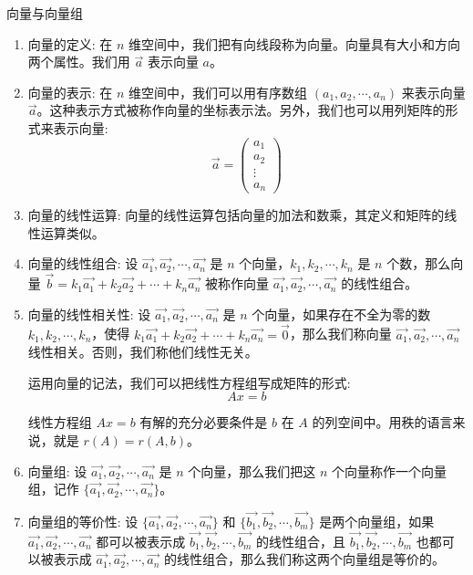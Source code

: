 \documentclass[a4paper,12pt]{ctexart}
\begin{document}
\begin{mydef}{向量与向量组}{}
\begin{enumerate}
    \item 向量的定义: 在 $n$ 维空间中，我们把有向线段称为向量。向量具有大小和方向两个属性。我们用 $\vec{a}$ 表示向量 $a$。
    
    \item 向量的表示: 在 $n$ 维空间中，我们可以用有序数组 $(a_1, a_2, \cdots , a_n)$ 来表示向量 $\vec{a}$。这种表示方式被称作向量的坐标表示法。另外，我们也可以用列矩阵的形式来表示向量:
    \[
    \vec{a} =
    \begin{pmatrix}
    a_1 \\
    a_2 \\
    \vdots \\
    a_n
    \end{pmatrix}
    \]
    
    \item 向量的线性运算: 向量的线性运算包括向量的加法和数乘，其定义和矩阵的线性运算类似。
    
    \item 向量的线性组合: 设 $\vec{a_1}, \vec{a_2}, \cdots , \vec{a_n}$ 是 $n$ 个向量，$k_1, k_2, \cdots , k_n$ 是 $n$ 个数，那么向量 $\vec{b} = k_1 \vec{a_1} + k_2 \vec{a_2} + \cdots + k_n \vec{a_n}$ 被称作向量 $\vec{a_1}, \vec{a_2}, \cdots , \vec{a_n}$ 的线性组合。
    
    \item 向量的线性相关性: 设 $\vec{a_1}, \vec{a_2}, \cdots , \vec{a_n}$ 是 $n$ 个向量，如果存在不全为零的数 $k_1, k_2, \cdots , k_n$，使得 $k_1 \vec{a_1} + k_2 \vec{a_2} + \cdots + k_n \vec{a_n} = \vec{0}$，那么我们称向量 $\vec{a_1}, \vec{a_2}, \cdots , \vec{a_n}$ 线性相关。否则，我们称他们线性无关。
    
    运用向量的记法，我们可以把线性方程组写成矩阵的形式:
    \[
    Ax = b
    \]
    
    线性方程组 $Ax=b$ 有解的充分必要条件是 $b$ 在 $A$ 的列空间中。用秩的语言来说，就是 $r(A) = r(A,b)$。
    
    \item 向量组: 设 $\vec{a_1}, \vec{a_2}, \cdots , \vec{a_n}$ 是 $n$ 个向量，那么我们把这 $n$ 个向量称作一个向量组，记作 $\{\vec{a_1}, \vec{a_2}, \cdots , \vec{a_n}\}$。
    
    \item 向量组的等价性: 设 $\{\vec{a_1}, \vec{a_2}, \cdots , \vec{a_n}\}$ 和 $\{\vec{b_1}, \vec{b_2}, \cdots , \vec{b_m}\}$ 是两个向量组，如果 $\vec{a_1}, \vec{a_2}, \cdots , \vec{a_n}$ 都可以被表示成 $\vec{b_1}, \vec{b_2}, \cdots , \vec{b_m}$ 的线性组合，且 $\vec{b_1}, \vec{b_2}, \cdots , \vec{b_m}$ 也都可以被表示成 $\vec{a_1}, \vec{a_2}, \cdots , \vec{a_n}$ 的线性组合，那么我们称这两个向量组是等价的。
\end{enumerate}
\end{mydef}
\end{document}
